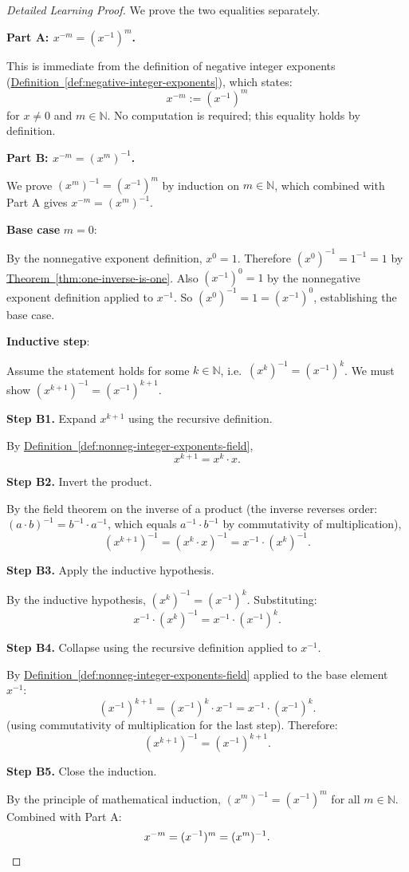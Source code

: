 \begin{proof}[Detailed Learning Proof]
\LRAProofBodyStart

We prove the two equalities separately.

\textbf{Part A: $x^{-m} = (x^{-1})^m$.}

This is immediate from the definition of negative integer exponents
(\hyperref[def:negative-integer-exponents]{Definition~\ref*{def:negative-integer-exponents}}),
which states:
\[
x^{-m} := (x^{-1})^m
\]
for $x\neq 0$ and $m\in\mathbb{N}$.  No computation is required; this equality
holds by definition.

\textbf{Part B: $x^{-m} = (x^m)^{-1}$.}

We prove $(x^m)^{-1} = (x^{-1})^m$ by induction on $m\in\mathbb{N}$, which
combined with Part A gives $x^{-m} = (x^m)^{-1}$.

\textbf{Base case} $m = 0$:

By the nonnegative exponent definition, $x^0 = 1$.  Therefore
$(x^0)^{-1} = 1^{-1} = 1$ by \hyperref[thm:one-inverse-is-one]{Theorem~\ref*{thm:one-inverse-is-one}}.
Also $(x^{-1})^0 = 1$ by the nonnegative exponent definition applied to $x^{-1}$.
So $(x^0)^{-1} = 1 = (x^{-1})^0$, establishing the base case.

\textbf{Inductive step}:

Assume the statement holds for some $k\in\mathbb{N}$, i.e.\ $(x^k)^{-1} = (x^{-1})^k$.
We must show $(x^{k+1})^{-1} = (x^{-1})^{k+1}$.

\textbf{Step B1.} Expand $x^{k+1}$ using the recursive definition.

By \hyperref[def:nonneg-integer-exponents-field]{Definition~\ref*{def:nonneg-integer-exponents-field}},
\[
x^{k+1} = x^k \cdot x.
\]

\textbf{Step B2.} Invert the product.

By the field theorem on the inverse of a product (the inverse reverses order:
$(a\cdot b)^{-1} = b^{-1}\cdot a^{-1}$, which equals $a^{-1}\cdot b^{-1}$
by commutativity of multiplication),
\[
(x^{k+1})^{-1} = (x^k\cdot x)^{-1} = x^{-1}\cdot (x^k)^{-1}.
\]

\textbf{Step B3.} Apply the inductive hypothesis.

By the inductive hypothesis, $(x^k)^{-1} = (x^{-1})^k$.  Substituting:
\[
x^{-1}\cdot(x^k)^{-1} = x^{-1}\cdot(x^{-1})^k.
\]

\textbf{Step B4.} Collapse using the recursive definition applied to $x^{-1}$.

By \hyperref[def:nonneg-integer-exponents-field]{Definition~\ref*{def:nonneg-integer-exponents-field}}
applied to the base element $x^{-1}$:
\[
(x^{-1})^{k+1} = (x^{-1})^k \cdot x^{-1} = x^{-1}\cdot(x^{-1})^k.
\]
(using commutativity of multiplication for the last step).  Therefore:
\[
(x^{k+1})^{-1} = (x^{-1})^{k+1}.
\]

\textbf{Step B5.} Close the induction.

By the principle of mathematical induction, $(x^m)^{-1} = (x^{-1})^m$ for
all $m\in\mathbb{N}$.  Combined with Part A:
\[
x^{-m} = (x^{-1})^m = (x^m)^{-1}. \qedhere
\]
\end{proof}

